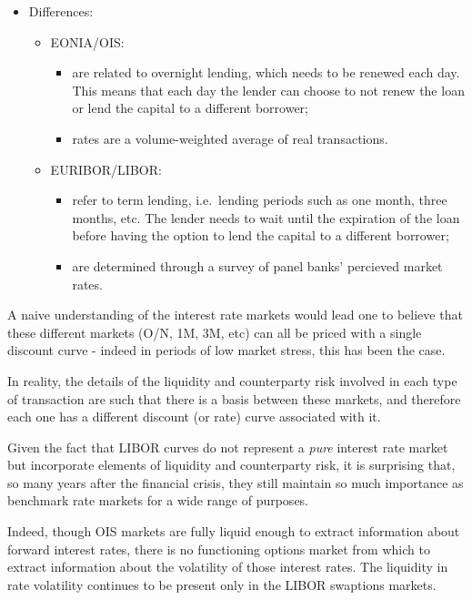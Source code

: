 \documentclass[11pt]{article}
\providecommand{\tightlist}{%
      \setlength{\itemsep}{0pt}\setlength{\parskip}{0pt}}
\begin{document}
    \begin{itemize}
\tightlist
\item
  Differences:

  \begin{itemize}
  \tightlist
  \item
    EONIA/OIS:

    \begin{itemize}
    \tightlist
    \item
      are related to overnight lending, which needs to be renewed each
      day. This means that each day the lender can choose to not renew
      the loan or lend the capital to a different borrower;
    \item
      rates are a volume-weighted average of real transactions.
    \end{itemize}
  \item
    EURIBOR/LIBOR:

    \begin{itemize}
    \tightlist
    \item
      refer to term lending, i.e.~lending periods such as one month,
      three months, etc. The lender needs to wait until the expiration
      of the loan before having the option to lend the capital to a
      different borrower;
    \item
      are determined through a survey of panel banks' percieved market
      rates.
    \end{itemize}
  \end{itemize}
\end{itemize}

    A naive understanding of the interest rate markets would lead one to
believe that these different markets (O/N, 1M, 3M, etc) can all be
priced with a single discount curve - indeed in periods of low market
stress, this has been the case.

In reality, the details of the liquidity and counterparty risk involved
in each type of transaction are such that there is a basis between these
markets, and therefore each one has a different discount (or rate) curve
associated with it.

    Given the fact that LIBOR curves do not represent a \emph{pure} interest
rate market but incorporate elements of liquidity and counterparty risk,
it is surprising that, so many years after the financial crisis, they
still maintain so much importance as benchmark rate markets for a wide
range of purposes.

Indeed, though OIS markets are fully liquid enough to extract
information about forward interest rates, there is no functioning
options market from which to extract information about the volatility of
those interest rates. The liquidity in rate volatility continues to be
present only in the LIBOR swaptions markets.
\end{document}
